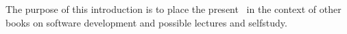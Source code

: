 
\begynd
\pind The purpose of this introduction is to place the present \primer\
\pind in the context of  other books
      \cite{TheSEBook1,TheSEBook2,TheSEBook3} on software development 
\pind and possible lectures and self\ysf{-}study.
\afslut

\label{chap:Introduction.n}

